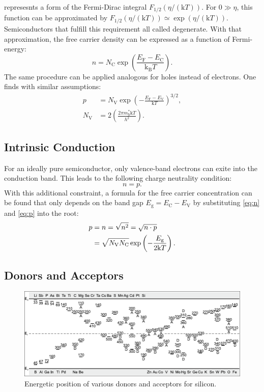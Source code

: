  represesnts a form of the Fermi-Dirac integral
$F_{1 /2}(\eta  / (\mathrm{k}T))$.
For $0 \gg \eta$,
this function can be approximated by $F_{1 /2}(\eta  / (\mathrm{k}T))
	\simeq \exp(\eta /(\mathrm{k}T))$.
Semiconductors that fulfill this requirement all called degenerate.
With that approximation, the free carrier density can be expressed as
a function of Fermi-energy:
\begin{equation}
	n	= { N_{\mathrm{C}} }\exp\left( \frac{E_{\mathrm{F}}
		-E_{\mathrm{C}}}{\mathrm{k_B}T} \right).
	\label{eq:n}
\end{equation}
The same procedure can be applied analogous for holes instead of
electrons.
One finds with similar assumptions:
\begin{align}
	p            & = N_\mathrm{V} \exp
	\left( - \frac{E_{\mathrm{F}}-E_{\mathrm{V}}}{\mathrm{k}T} \right)^{3 / 2}
	\label{eq:p},                                        \\
	N_\mathrm{V} & = 2 \left( \frac{2 \pi m^*_\mathrm{h}
		\mathrm{k}T}{h^2} \right).
\end{align}

\subsection{Intrinsic Conduction}
For an ideally pure semiconductor, only valence-band electrons
can exite into the conduction band.
This leads to the following charge neutrality condition:
\begin{equation}
	n = p.
\end{equation}
With this additional constraint, a formula for the free
carrier concentration can be found that only depends on the
band gap $E_\mathrm{g} = E_\mathrm{C} - E_\mathrm{V}$ by
substituting \cref{eq:n} and \cref{eq:p}
into the root:
\begin{align}
	p & = n = \sqrt{n^2} = \sqrt{n \cdot p} \notag \\
	  & =\sqrt{ N_{\mathrm{V}}N_{\mathrm{C}} }
	\exp\left( -\frac{E_{\mathrm{g}}}{2\mathrm{k}T} \right).
\end{align}

\subsection{Donors and Acceptors}
\begin{figure}
	\centering
	\includegraphics[width=0.6\linewidth]{../assets/energy_level.png}
	\caption{Energetic position of various donors and acceptors
		for silicon. }
	\label{fig:energy_level}
\end{figure}

